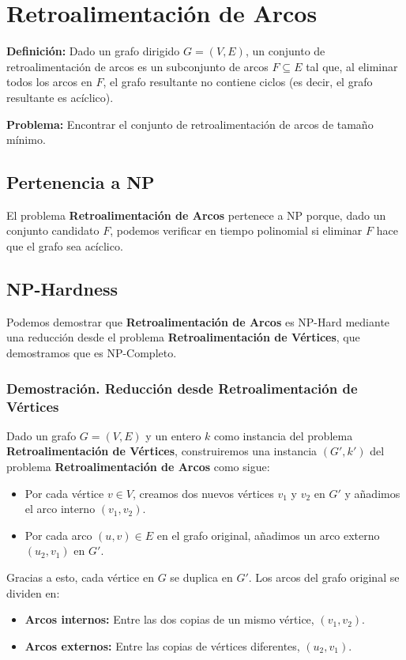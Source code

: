 \documentclass[a4paper,12pt]{article}
\begin{document}
\section{Retroalimentaci\'on de Arcos}

\textbf{Definici\'on:} Dado un grafo dirigido $G = (V, E)$, un conjunto de retroalimentaci\'on de arcos es un subconjunto de arcos $F \subseteq E$ tal que, al eliminar todos los arcos en $F$, el grafo resultante no contiene ciclos (es decir, el grafo resultante es ac\'iclico).

\textbf{Problema:} Encontrar el conjunto de retroalimentaci\'on de arcos de tama\~no m\'inimo.

\subsection{Pertenencia a NP}
El problema \textbf{Retroalimentaci\'on de Arcos} pertenece a NP porque, dado un conjunto candidato $F$, podemos verificar en tiempo polinomial si eliminar $F$ hace que el grafo sea ac\'iclico. 
\subsection{NP-Hardness}
Podemos demostrar que \textbf{Retroalimentaci\'on de Arcos} es NP-Hard mediante una reducci\'on desde el problema \textbf{Retroalimentaci\'on de V\'ertices}, que demostramos que es NP-Completo.

\subsubsection{Demostraci\'on. Reducci\'on desde Retroalimentaci\'on de V\'ertices}
Dado un grafo $G = (V, E)$ y un entero $k$ como instancia del problema \textbf{Retroalimentaci\'on de V\'ertices}, construiremos una instancia $(G', k')$ del problema \textbf{Retroalimentaci\'on de Arcos} como sigue:
\begin{itemize}
    \item Por cada v\'ertice $v \in V$, creamos dos nuevos v\'ertices $v_1$ y $v_2$ en $G'$ y a\~nadimos el arco interno $(v_1, v_2)$.
    \item Por cada arco $(u, v) \in E$ en el grafo original, a\~nadimos un arco externo $(u_2, v_1)$ en $G'$.
\end{itemize}

Gracias a esto, cada v\'ertice en $G$ se duplica en $G'$. Los arcos del grafo original se dividen en:
\begin{itemize}
    \item \textbf{Arcos internos:} Entre las dos copias de un mismo v\'ertice, $(v_1, v_2)$.
    \item \textbf{Arcos externos:} Entre las copias de v\'ertices diferentes, $(u_2, v_1)$.
\end{itemize}
\end{document}
